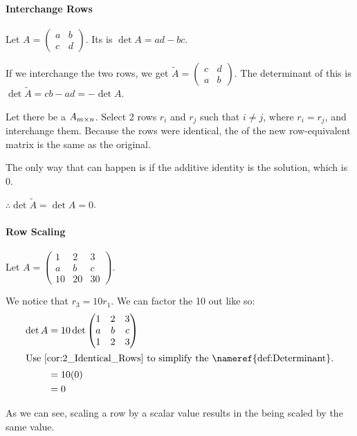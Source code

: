\paragraph{Interchange Rows}
Let $A =
\begin{pmatrix}
  a & b \\
  c & d
\end{pmatrix}
$.
Its  is $\det A = ad - bc$.

If we interchange the two rows, we get $\tilde{A} =
\begin{pmatrix}
  c & d \\
  a & b
\end{pmatrix}$.
The determinant of this is $\det \tilde{A} = cb - ad = -\det A$.

\begin{corollary}\label{cor:2_Identical_Rows}
  Let there be a  $A_{m \times n}$.
  Select 2 rows $r_{i}$ and $r_{j}$ such that $i \neq j$, where $r_{i} = r_{j}$, and interchange them.
  Because the rows were identical, the  of the new row-equivalent matrix is the same as the original.

  The only way that can happen is if the additive identity is the solution, which is 0.

  $\therefore \det \tilde{A} = \det A = 0$.
\end{corollary}

\paragraph{Row Scaling}
Let $A =
\begin{pmatrix}
  1 & 2 & 3 \\
  a & b & c \\
  10 & 20 & 30
\end{pmatrix}$.

We notice that $r_{3} = 10r_{1}$.
We can factor the 10 out like so:
\begin{align*}
  \det A &= 10 \det
  \begin{pmatrix}
    1 & 2 & 3 \\
    a & b & c \\
    1 & 2 & 3
  \end{pmatrix} \\
  \intertext{Use \Cref{cor:2_Identical_Rows} to simplify the \nameref{def:Determinant}.}
         &= 10 (0) \\
         &= 0
\end{align*}

As we can see, scaling a row by a scalar value results in the  being scaled by the same value.



